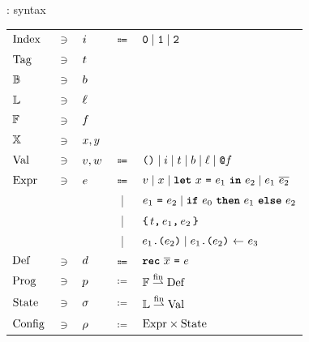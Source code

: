 \begin{frame}{\DataLang: syntax}
\centering
\begin{tabular}{lclcl}
        $\datalangIdx[]$
        & $\ni$ &
        $\datalangIdx$
        & $\Coloneqq$ &
        $\texttt{0} \mid \texttt{1} \mid \texttt{2}$
    \\
        $\datalangTag[]$
        & $\ni$ &
        $\datalangTag$
    \\
        $\datalangBool[]$
        & $\ni$ &
        $\datalangBool$
	\\
		$\datalangLoc[]$
		& $\ni$ &
		$\datalangLoc$
    \\
        $\datalangFn[]$
        & $\ni$ &
        $\datalangFn$
    \\
        $\datalangVar[]$
        & $\ni$ &
        $\datalangVar, \datalangVarTwo$
	\\
        $\datalangVal[]$
        & $\ni$ &
        $\datalangVal, \datalangValTwo$
        & $\Coloneqq$ &
        $\datalangUnit \mid \datalangIdx \mid \datalangTag \mid \datalangBool \mid \datalangLoc \mid \datalangFnptr{\datalangFn}$
    \\
        $\datalangExpr[]$
        & $\ni$ &
        $\datalangExpr$
        & $\Coloneqq$ &
        $\datalangVal \mid \datalangVar \mid \datalangLet{\datalangVar}{\datalangExpr_1}{\datalangExpr_2} \mid \datalangCall{\datalangExpr_1}{\overline{\datalangExpr_2}}$
    \\
        &&
        & | &
        $\datalangEq{\datalangExpr_1}{\datalangExpr_2} \mid \datalangIf{\datalangExpr_0}{\datalangExpr_1}{\datalangExpr_2}$
    \\
        &&
        & | &
        $\datalangBlock{\datalangTag}{\datalangExpr_1}{\datalangExpr_2}$
    \\
        &&
        & | &
        $\datalangLoad{\datalangExpr_1}{\datalangExpr_2} \mid \datalangStore{\datalangExpr_1}{\datalangExpr_2}{\datalangExpr_3}$
    \\
        $\datalangDef[]$
        & $\ni$ &
        $\datalangDef$
        & $\Coloneqq$ &
        $\datalangRec{\overline{\datalangVar}}{\datalangExpr}$
    \\
        $\datalangProg[]$
        & $\ni$ &
        $\datalangProg$
        & $\coloneqq$ &
        $\datalangFn[] \finmap \datalangDef[]$
    \\
        $\datalangState[]$
        & $\ni$ &
        $\datalangState$    
        & $\coloneqq$ &
        $\datalangLoc[] \finmap \datalangVal[]$
    \\
        $\datalangConfig[]$
        & $\ni$ &
        $\datalangConfig$
        & $\coloneqq$ &
        $\datalangExpr[] \times \datalangState[]$
\end{tabular}
\vfill
\end{frame}

